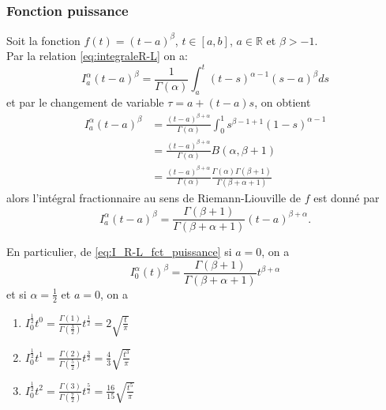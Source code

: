 \subsubsection*{Fonction puissance} 
Soit la fonction $f(t)=(t-a)^\beta$, \hspace{0.3cm} $t\in[a,b]$, \hspace{0.3cm} $a\in\mathbb{R}$ \hspace{0.3cm} et $\beta > -1$. \\
Par la relation \ref{eq:integraleR-L} on a:
\begin{equation*}
    I_{a}^{\alpha} (t-a)^\beta=\frac{1}{\Gamma(\alpha)} \int_{a}^{t}(t-s)^{\alpha - 1} (s-a)^{\beta}ds
\end{equation*}
    et par le changement de variable $\tau = a + (t-a)s$, on obtient
    \begin{align*}
         I_{a}^{\alpha} (t-a)^{\beta} &= \frac{(t-a)^{\beta+\alpha}}{\Gamma(\alpha)} \int_0^1 s^{\beta - 1 + 1}(1-s)^{\alpha - 1}\\
         &= \frac{(t-a)^{\beta + \alpha}}{\Gamma(\alpha)} B(\alpha, \beta +1)\\
         &= \frac{(t-a)^{\beta + \alpha}}{\Gamma(\alpha)} \frac{\Gamma(\alpha)\Gamma(\beta + 1)}{\Gamma(\beta + \alpha + 1)}
\end{align*}
alors  l'intégral fractionnaire au sens de Riemann-Liouville de $f$ est donné par
\begin{equation} \label{eq:I_R-L_fct_puissance}
    I_{a}^{\alpha} (t-a)^\beta=\frac{\Gamma(\beta +1)}{\Gamma(\beta + \alpha + 1)}(t-a)^{\beta + \alpha}.
    \end{equation}

\begin{exemple}
En particulier, de \ref{eq:I_R-L_fct_puissance} si $a=0$, on a
\begin{equation*}
    I_{0}^{\alpha} (t)^{\beta} = \frac{\Gamma(\beta + 1)}{\Gamma(\beta + \alpha + 1)}t^{\beta + \alpha}
\end{equation*}
    et si $\alpha = \frac{1}{2}$ et $a = 0$, on a 
    \begin{enumerate}
        \item $I_0^{\frac{1}{2}}t^0=\frac{\Gamma(1)}{\Gamma(\frac{3}{2})} t^{\frac{1}{2}} = 2\sqrt{\frac{t}{\pi}}$
        \item $I_0^{\frac{1}{2}} t^1=\frac{\Gamma(2)}{\Gamma(\frac{5}{2})} t^{\frac{3}{2}} = \frac{4}{3}\sqrt{\frac{t^3}{\pi}}$
        \item $I_0^{\frac{1}{2}} t^2  =\frac{\Gamma(3)}{\Gamma(\frac{7}{2})} t^{\frac{5}{2}} = \frac{16}{15}\sqrt{\frac{t^5}{\pi}}$
    \end{enumerate}
\end{exemple}
